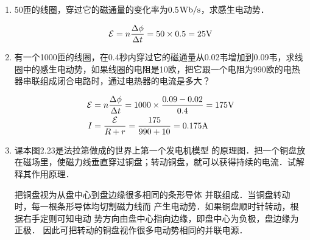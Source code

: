 \begin{enumerate}
\item 50匝的线圈，穿过它的磁通量的变化率为0.5${\rm Wb}/{\rm s}$，求感生电动势．

\begin{solution}
    \[\mathcal{E}=n\frac{\Delta \phi}{\Delta t}=50\times 0.5=25{\rm V}\]
\end{solution}

\item 有一个1000匝的线圈，在0.4秒内穿过它的磁通量从0.02韦增加到0.09韦，求线圈中的感生电动势，如果线圈的电阻是10欧，把它跟一个电阻为990欧的电热器串联组成闭合电路时，通过电热器的电流是多大？

\begin{solution}
\[\begin{split}
    \mathcal{E}&=n\frac{\Delta \phi}{\Delta t}=1000\times \frac{0.09-0.02}{0.4}=175{\rm V}  \\
    I&=\frac{\mathcal{E}}{R+r}=\frac{175}{990+10}=0.175{\rm A}
\end{split}\]
\end{solution}

\item 课本图2.23是法拉第做成的世界上第一个发电机模型
的原理图．把一个铜盘放在磁场里，使磁力线垂直穿过铜盘；转动铜盘，就可以获得持续的电流．试解释其作用原理．

\begin{solution}
把铜盘视为从盘中心到盘边缘很多相同的条形导体
并联组成．当铜盘转动时，每一根条形导体均切割磁力线而
产生电动势．如果铜盘顺时针转动，根据右手定则可知电动
势方向由盘中心指向边缘，即盘中心为负极，盘边缘为正极．
因此可把转动的铜盘视作很多电动势相同的并联电源．
\end{solution}

\end{enumerate}




